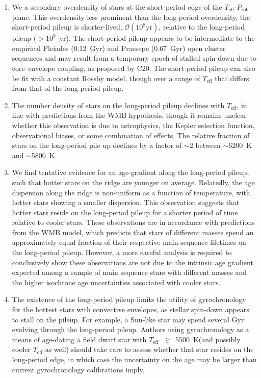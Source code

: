 \documentclass[trackchanges,twocolumn]{aastex631}
\newcommand{\teffmin}{5500~K\xspace}
\newcommand{\curtis}{C20\xspace}
\newcommand{\teff}{\ensuremath{T_{\mathrm{eff}}}\xspace}
\newcommand{\prot}{\ensuremath{P_\mathrm{rot}}\xspace}
\begin{document}
\begin{enumerate}
    \item We  a secondary overdensity of stars at the short-period edge of the \teff-\prot plane. This overdensity  less prominent than the long-period overdensity,  the short-period pileup is shorter-lived, $\mathcal{O}(10^8 \text{yr})$, relative to the long-period pileup ($>10^9$~yr). The short-period pileup appears to be intermediate to the empirical Pleiades (0.12~Gyr) and Praesepe (0.67~Gyr) open cluster sequences and may result from a temporary epoch of stalled spin-down due to core–envelope coupling, as proposed by \curtis. The short-period pileup can also be fit with a constant Rossby model, though over a range of \teff that differs from that of the long-period pileup.
    
    \item The number density of stars on the long-period pileup declines with \teff, in line with predictions from the WMB hypothesis, though it remains unclear whether this observation is due to astrophysics, the Kepler selection function, observational biases, or some combination of effects. The relative fraction of stars on the long-period pile up declines by a factor of $\sim$2 between $\sim$6200~K and $\sim$5800~K. 
    
    \item We find tentative evidence for an age-gradient along the long-period pileup, such that hotter stars on the ridge are younger on average. Relatedly, the age dispersion along the ridge is non-uniform as a function of temperature, with hotter stars showing a smaller dispersion. This observation suggests that hotter stars reside on the long-period pileup for a shorter period of time relative to cooler stars. These observations are in accordance with predictions from the WMB model, which predicts that stars of different masses spend an approximately equal fraction of their respective main-sequence lifetimes on the long-period pileup. However, a more careful analysis is required to conclusively show these observations are not due to the intrinsic age gradient expected among a sample of main sequence stars with different masses and the higher isochrone age uncertainties associated with cooler stars.
    
    \item The existence of the long-period pileup limits the utility of gyrochronology for the hottest stars with convective envelopes, as stellar spin-down appears to stall on the pileup. For example, a Sun-like star may spend several Gyr evolving through the long-period pileup. Authors using gyrochronology as a means of age-dating a field dwarf star with \teff~$\gtrsim$~\teffmin (and possibly cooler \teff as well) should take care to assess whether that star resides on the long-period edge, in which case the uncertainty on the age may be larger than current gyrochronology calibrations imply.
    

\end{enumerate}
\end{document}
